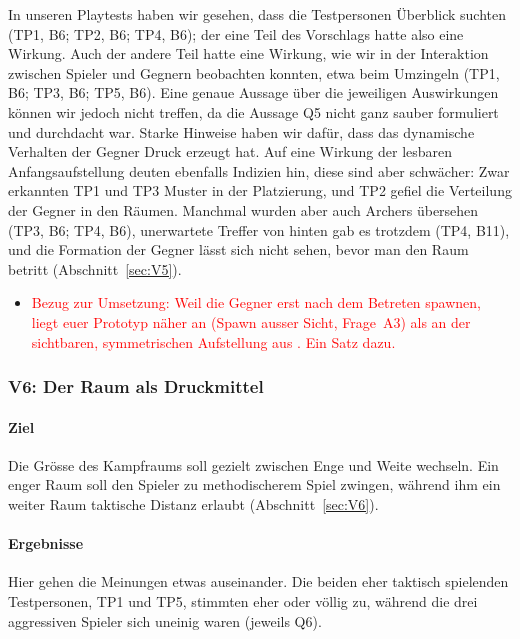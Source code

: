 \documentclass[../Main.tex]{subfiles}
\begin{document}
In unseren Playtests haben wir gesehen, dass die Testpersonen Überblick suchten (TP1, B6; TP2, B6; TP4, B6); der eine Teil des Vorschlags hatte also eine Wirkung. Auch der andere Teil hatte eine Wirkung, wie wir in der Interaktion zwischen Spieler und Gegnern beobachten konnten, etwa beim Umzingeln (TP1, B6; TP3, B6; TP5, B6). Eine genaue Aussage über die jeweiligen Auswirkungen können wir jedoch nicht treffen, da die Aussage Q5 nicht ganz sauber formuliert und durchdacht war. Starke Hinweise haben wir dafür, dass das dynamische Verhalten der Gegner Druck erzeugt hat. Auf eine Wirkung der lesbaren Anfangsaufstellung deuten ebenfalls Indizien hin, diese sind aber schwächer: Zwar erkannten TP1 und TP3 Muster in der Platzierung, und TP2 gefiel die Verteilung der Gegner in den Räumen. Manchmal wurden aber auch Archers übersehen (TP3, B6; TP4, B6), unerwartete Treffer von hinten gab es trotzdem (TP4, B11), und die Formation der Gegner lässt sich nicht sehen, bevor man den Raum betritt (Abschnitt~\ref{sec:V5}).

\begin{itemize}[leftmargin=1.5cm]
    \item \textcolor{red}{Bezug zur Umsetzung: Weil die Gegner erst nach dem Betreten spawnen, liegt euer Prototyp näher an  (Spawn ausser Sicht, Frage~A3) als an der sichtbaren, symmetrischen Aufstellung aus . Ein Satz dazu.}
\end{itemize}

\subsubsection{V6: Der Raum als Druckmittel}

\paragraph{Ziel}
Die Grösse des Kampfraums soll gezielt zwischen Enge und Weite wechseln. Ein enger Raum soll den Spieler zu methodischerem Spiel zwingen, während ihm ein weiter Raum taktische Distanz erlaubt (Abschnitt~\ref{sec:V6}).

\paragraph{Ergebnisse}
Hier gehen die Meinungen etwas auseinander. Die beiden eher taktisch spielenden Testpersonen, TP1 und TP5, stimmten eher oder völlig zu, während die drei aggressiven Spieler sich uneinig waren (jeweils Q6).
\end{document}
